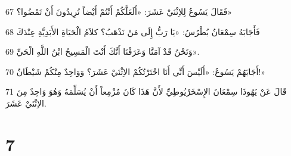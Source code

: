 \par 67 فَقَالَ يَسُوعُ لِلاِثْنَيْ عَشَرَ: «أَلَعَلَّكُمْ أَنْتُمْ أَيْضاً تُرِيدُونَ أَنْ تَمْضُوا؟»
\par 68 فَأَجَابَهُ سِمْعَانُ بُطْرُسُ: «يَا رَبُّ إِلَى مَنْ نَذْهَبُ؟ كلاَمُ الْحَيَاةِ الأَبَدِيَّةِ عِنْدَكَ
\par 69 وَنَحْنُ قَدْ آمَنَّا وَعَرَفْنَا أَنَّكَ أَنْتَ الْمَسِيحُ ابْنُ اللَّهِ الْحَيِّ».
\par 70 أَجَابَهُمْ يَسُوعُ: «أَلَيْسَ أَنِّي أَنَا اخْتَرْتُكُمْ الاِثْنَيْ عَشَرَ؟ وَوَاحِدٌ مِنْكُمْ شَيْطَانٌ!»
\par 71 قَالَ عَنْ يَهُوذَا سِمْعَانَ الإِسْخَرْيُوطِيِّ لأَنَّ هَذَا كَانَ مُزْمِعاً أَنْ يُسَلِّمَهُ وَهُوَ وَاحِدٌ مِنَ الاِثْنَيْ عَشَرَ.

\chapter{7}


